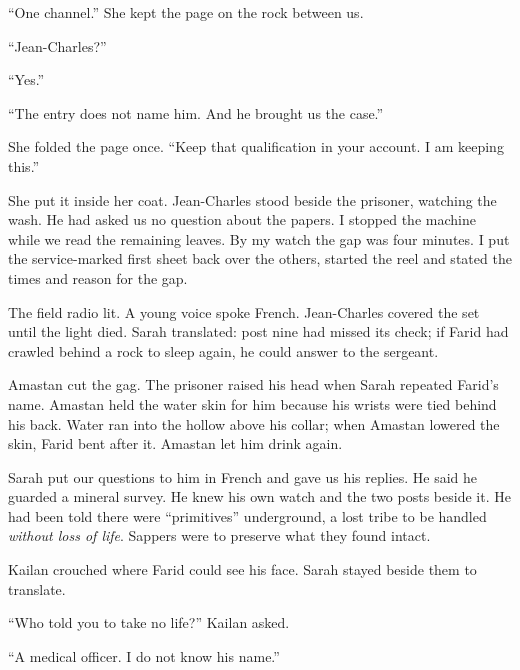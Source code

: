 ``One channel.'' She kept the page on the rock between us.\par

``Jean-Charles?''\par

``Yes.''\par

``The entry does not name him. And he brought us the case.''\par

She folded the page once. ``Keep that qualification in your account. I am keeping this.''\par

She put it inside her coat. Jean-Charles stood beside the prisoner, watching the wash. He had asked us no question about the papers. I stopped the machine while we read the remaining leaves. By my watch the gap was four minutes. I put the service-marked first sheet back over the others, started the reel and stated the times and reason for the gap.\par

The field radio lit. A young voice spoke French. Jean-Charles covered the set until the light died. Sarah translated: post nine had missed its check; if Farid had crawled behind a rock to sleep again, he could answer to the sergeant.\par

Amastan cut the gag. The prisoner raised his head when Sarah repeated Farid's name. Amastan held the water skin for him because his wrists were tied behind his back. Water ran into the hollow above his collar; when Amastan lowered the skin, Farid bent after it. Amastan let him drink again.\par

Sarah put our questions to him in French and gave us his replies. He said he guarded a mineral survey. He knew his own watch and the two posts beside it. He had been told there were ``primitives'' underground, a lost tribe to be handled \emph{without loss of life}. Sappers were to preserve what they found intact.\par

Kailan crouched where Farid could see his face. Sarah stayed beside them to translate.\par

``Who told you to take no life?'' Kailan asked.\par

``A medical officer. I do not know his name.''\par


